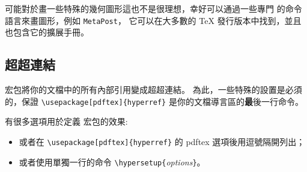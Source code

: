 可能對於畫一些特殊的幾何圖形這也不是很理想，幸好可以通過一些專門
的命令語言來畫圖形，例如 \texttt{MetaPost}，
它可以在大多數的 \TeX{} 發行版本中找到，並且也包含它的擴展手冊。

\subsection{超超連結}
\label{ssec:pdfhyperref}


 宏包將你的文檔中的所有內部引用變成超超連結。
為此，一些特殊的設置是必須的，保證
\verb+\usepackage[pdftex]{hyperref}+ 是你的文檔導言區的{\textbf
最後}一行命令。


有很多選項用於定義  宏包的效果:
\begin{itemize}
\item
或者在 \verb+\usepackage[pdftex]{hyperref}+ 的 pdftex 選項後用逗號隔開列出；
\item 或者使用單獨一行的命令 \verb+\hypersetup{+\emph{options}\verb+}+。
\end{itemize}


